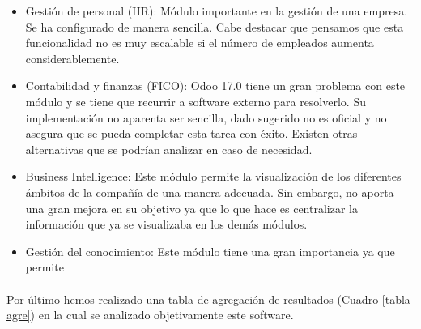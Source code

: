 \begin{itemize}
    \item Gestión de personal (HR): Módulo importante en la gestión de una empresa. Se ha configurado de manera sencilla. Cabe destacar que pensamos que esta funcionalidad no es muy escalable si el número de empleados aumenta considerablemente.
    \item Contabilidad y finanzas (FICO): Odoo 17.0 tiene un gran problema con este módulo y se tiene que recurrir a software externo para resolverlo. Su implementación no aparenta ser sencilla, dado sugerido no es oficial y no asegura que se pueda completar esta tarea con éxito. Existen otras alternativas que se podrían analizar en caso de necesidad.
    \item Business Intelligence: Este módulo permite la visualización de los diferentes ámbitos de la compañía de una manera adecuada. Sin embargo, no aporta una gran mejora en su objetivo ya que lo que hace es centralizar la información que ya se visualizaba en los demás módulos.
    \item Gestión del conocimiento: Este módulo tiene una gran importancia ya que permite 
\end{itemize}

\paragraph{}
Por último hemos realizado una tabla de agregación de resultados (Cuadro \ref{tabla-agre}) en la cual se analizado objetivamente este software.



